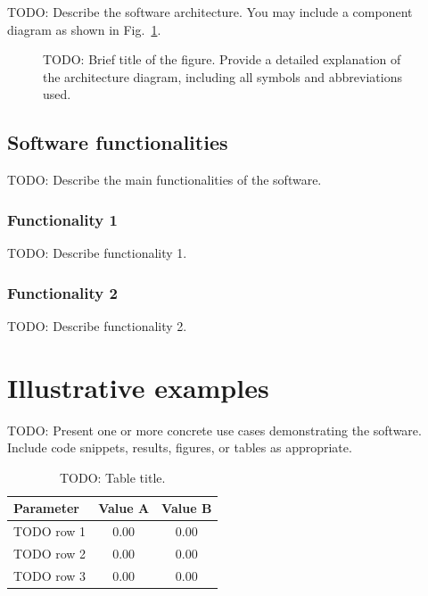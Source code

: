 \documentclass[preprint,12pt]{elsarticle}
\begin{document}
TODO: Describe the software architecture. You may include a component diagram
as shown in Fig.~\ref{fig:architecture}.

\begin{figure}[ht]
  \centering
  \fbox{\rule{0pt}{5cm}\rule{0.82\linewidth}{0pt}}
  \caption{TODO: Brief title of the figure. Provide a detailed explanation of
the architecture diagram, including all symbols and abbreviations used.}
  \label{fig:architecture}
\end{figure}

\subsection{Software functionalities}
\label{sec:functionalities}

TODO: Describe the main functionalities of the software.

\subsubsection{Functionality 1}
\label{sec:functionality1}

TODO: Describe functionality 1.

\subsubsection{Functionality 2}
\label{sec:functionality2}

TODO: Describe functionality 2.

\section{Illustrative examples}
\label{sec:examples}

TODO: Present one or more concrete use cases demonstrating the software. Include
code snippets, results, figures, or tables as appropriate.

\begin{table}[ht]
  \caption{TODO: Table title.}
  \label{tab:results}
  \centering
  \begin{tabular}{lcc}
    \toprule
    \textbf{Parameter} & \textbf{Value A} & \textbf{Value B} \\
    \midrule
    TODO row 1 & 0.00 & 0.00 \\
    TODO row 2 & 0.00 & 0.00 \\
    TODO row 3 & 0.00 & 0.00 \\
    \bottomrule
  \end{tabular}
\end{table}
\end{document}
